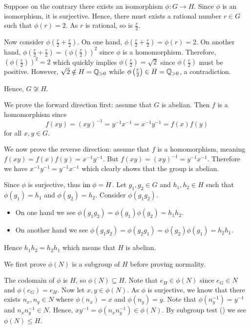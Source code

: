 \begin{questions}
    \item Suppose on the contrary there exists an isomorphism $\phi: G \to H$. Since $\phi$ is an isomorphism, it is surjective. Hence, there must exists a rational number $r \in G$ such that $\phi(r) = 2$. As $r$ is rational, so is $\frac r2$.

    Now consider $\phi\left(\frac r2 + \frac r2\right)$. On one hand, $\phi\left(\frac r2 + \frac r2\right) = \phi(r) = 2$. On another hand, $\phi(\frac r2 + \frac r2) = \left(\phi\left(\frac r2\right)\right)^2$ since $\phi$ is a homomorphism. Therefore, $\left(\phi\left(\frac r2\right)\right)^2 = 2$ which quickly implies $\phi\left(\frac r2\right) = \sqrt 2$ since $\phi\left(\frac r2\right)$ must be positive. However, $\sqrt 2 \notin H = \mathbb{Q}_{>0}$ while $\phi\left(\frac r2\right) \in H = \mathbb{Q}_{>0}$, a contradiction.

    Hence, $G \not\cong H$.

    \item We prove the forward direction first: assume that $G$ is abelian. Then $f$ is a homomorphism since
    \[
        f(xy) = (xy)^{-1} = y^{-1}x^{-1} = x^{-1}y^{-1} = f(x)f(y)
    \]
    for all $x, y \in G$.

    We now prove the reverse direction: assume that $f$ is a homomorphism, meaning $f(xy) = f(x)f(y) = x^{-1}y^{-1}$. But $f(xy) = (xy)^{-1} = y^{-1}x^{-1}$. Therefore we have $x^{-1}y^{-1} = y^{-1}x^{-1}$ which clearly shows that the group is abelian.

    \item Since $\phi$ is surjective, thus $\mathrm{im}\; \phi = H$. Let $g_1, g_2 \in G$ and $h_1, h_2 \in H$ such that $\phi(g_1) = h_1$ and $\phi(g_2) = h_2$. Consider $\phi(g_1g_2)$.
    \begin{itemize}
        \item On one hand we see $\phi(g_1g_2) = \phi(g_1)\phi(g_2) = h_1h_2$.
        \item On another hand we see $\phi(g_1g_2) = \phi(g_2g_1) = \phi(g_2)\phi(g_1) = h_2h_1$.
    \end{itemize}
    Hence $h_1h_2 = h_2h_1$ which means that $H$ is abelian.

    \item We first prove $\phi(N)$ is a subgroup of $H$ before proving normality.

    The codomain of $\phi$ is $H$, so $\phi(N) \subseteq H$. Note that $e_H \in \phi(N)$ since $e_G \in N$ and $\phi(e_G) = e_H$. Now let $x, y \in \phi(N)$. As $\phi$ is surjective, we know that there exists $n_x, n_y \in N$ where $\phi(n_x) = x$ and $\phi(n_y) = y$. Note that $\phi(n_y^{-1}) = y^{-1}$ and $n_xn_y^{-1} \in N$. Hence, $xy^{-1} = \phi(n_xn_y^{-1}) \in \phi(N)$. By subgroup test () we see $\phi(N) \leq H$.


\end{questions}
